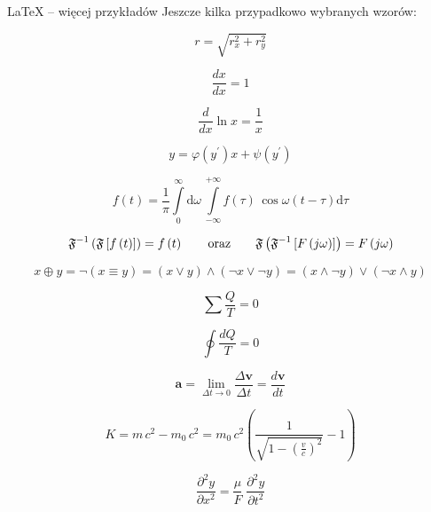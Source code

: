 \begin{easyappendix}{\LaTeX{} -- więcej przykładów}
Jeszcze kilka przypadkowo wybranych wzorów:

\begin{equation*}
	r = \sqrt{r_x^2 + r_y^2}
\end{equation*}

\begin{equation}
	\frac{dx}{dx} = 1
\end{equation}

\begin{equation}
	\frac{d}{dx} \ln x = \frac{1}{x}
\end{equation}

\begin{equation}
	y = \varphi  (y^\prime)x + \psi(y^\prime)
\end{equation}

\begin{equation}
	f(t) = \frac{1}{\pi} \int\limits_0^\infty \mathrm{d} \omega \,\int\limits_{-\infty}^{+\infty} f(\tau)\, \cos \omega (t-\tau)  \mathrm{d}\tau
\end{equation}

\[
\mathfrak{F}^{-1}\left(\mathfrak{F} \left[ f\left(t \right ) \right ] \right ) = f \left(t \right )
\qquad \textup{oraz} \qquad
\mathfrak{F}\left(\mathfrak{F}^{-1} \left[ F\left(j\omega \right ) \right ] \right ) = F \left(j\omega \right )
\]

\begin{equation*}
	x \oplus y = \neg (x \equiv y) = (x \vee y) \wedge (\neg x \vee \neg y) = (x \wedge \neg y) \vee (\neg x \wedge y)
\end{equation*}

\begin{equation*}
	\sum \frac{Q}{T} = 0
\end{equation*}

\begin{equation}
	\oint \frac{dQ}{T} = 0
\end{equation}

\begin{equation}
	\pmb{a} = \lim\limits_{\Delta t \to 0} \frac{\Delta \pmb{v}}{\Delta t} = \frac{d\pmb{v}}{dt}
\end{equation}

\begin{equation}
	K = m\,c^2 - m_0\,c^2 
	= m_0\,c^2 \left(
	\frac{1}{ \sqrt{1 - \left( \frac{v}{c} \right)^2 } } -1 
	\right)
\end{equation}

\begin{equation}
	\frac{\partial^2 y}{\partial x^2} = \frac{\mu}{F} \; \frac{\partial^2 y}{\partial t^2}
\end{equation}


\end{easyappendix}
